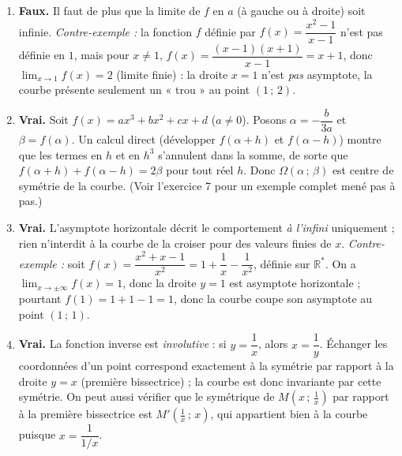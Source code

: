 \documentclass[11pt]{article}
\begin{document}
\begin{corrige}
\begin{enumerate}
\item \textbf{Faux.} Il faut de plus que la limite de $f$ en $a$ (à gauche ou à droite) soit infinie. \emph{Contre-exemple :} la fonction $f$ définie par $f(x)=\dfrac{x^2-1}{x-1}$ n'est pas définie en $1$, mais pour $x\neq 1$, $f(x)=\dfrac{(x-1)(x+1)}{x-1}=x+1$, donc $\displaystyle\lim_{x\to 1}f(x)=2$ (limite finie) : la droite $x=1$ n'est \emph{pas} asymptote, la courbe présente seulement un « trou » au point $(1\,;\,2)$.
\item \textbf{Vrai.} Soit $f(x)=ax^3+bx^2+cx+d$ ($a\neq 0$). Posons $\alpha=-\dfrac{b}{3a}$ et $\beta=f(\alpha)$. Un calcul direct (développer $f(\alpha+h)$ et $f(\alpha-h)$) montre que les termes en $h$ et en $h^3$ s'annulent dans la somme, de sorte que $f(\alpha+h)+f(\alpha-h)=2\beta$ pour tout réel $h$. Donc $\Omega(\alpha\,;\,\beta)$ est centre de symétrie de la courbe. (Voir l'exercice 7 pour un exemple complet mené pas à pas.)
\item \textbf{Vrai.} L'asymptote horizontale décrit le comportement \emph{à l'infini} uniquement ; rien n'interdit à la courbe de la croiser pour des valeurs finies de $x$. \emph{Contre-exemple :} soit $f(x)=\dfrac{x^2+x-1}{x^2}=1+\dfrac{1}{x}-\dfrac{1}{x^2}$, définie sur $\mathbb{R}^*$. On a $\displaystyle\lim_{x\to\pm\infty}f(x)=1$, donc la droite $y=1$ est asymptote horizontale ; pourtant $f(1)=1+1-1=1$, donc la courbe coupe son asymptote au point $(1\,;\,1)$.
\item \textbf{Vrai.} La fonction inverse est \emph{involutive} : si $y=\dfrac{1}{x}$, alors $x=\dfrac{1}{y}$. Échanger les coordonnées d'un point correspond exactement à la symétrie par rapport à la droite $y=x$ (première bissectrice) ; la courbe est donc invariante par cette symétrie. On peut aussi vérifier que le symétrique de $M\left(x\,;\,\tfrac1x\right)$ par rapport à la première bissectrice est $M'\left(\tfrac1x\,;\,x\right)$, qui appartient bien à la courbe puisque $x=\dfrac{1}{1/x}$.
\end{enumerate}
\end{corrige}
\end{document}
